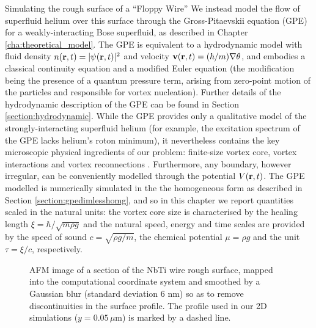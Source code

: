 \begin{chapter}{\label{cha:afm}Simulating the rough surface of a ``Floppy Wire''}
We instead model the flow of superfluid helium over this surface through the Gross-Pitaevskii equation (GPE) \cite{RobertsBerloff} for a weakly-interacting Bose superfluid, as described in Chapter \ref{cha:theoretical_model}. The GPE is equivalent to a hydrodynamic model with fluid density $n({\bf r},t)=|\psi({\bf r},t)|^2$ and velocity ${\bf v}({\bf r},t)=(\hbar/m)\nabla \theta$, and embodies a classical 
continuity equation and a modified Euler equation (the modification being the presence of a quantum pressure term, arising from zero-point motion of the particles {and responsible for vortex nucleation}). Further details of the hydrodynamic description of the GPE can be found in Section \ref{section:hydrodynamic}.
While the GPE provides only a qualitative model of the strongly-interacting superfluid helium (for example, the excitation spectrum of the GPE lacks helium's roton minimum), it nevertheless contains the key microscopic physical ingredients of our problem: finite-size vortex core, vortex interactions and vortex reconnections \cite{RobertsBerloff}.  Furthermore, any boundary, however irregular, can be conveniently modelled through the potential $V({\bf r},t)$. The GPE modelled is numerically simulated in the the homogeneous form as described in Section \ref{section:gpedimlesshomg}, and so in this chapter we report quantities scaled in the natural units: the vortex core size is characterised by the healing length $\xi=\hbar/\sqrt{m \rho g}$ and the natural speed, energy and time scales are provided by the speed of sound $c=\sqrt{\rho g/m}$, the chemical potential $\mu=\rho g$ and the unit $\tau=\xi/c$, respectively. 

\begin{figure}
  \centering
  \caption{\label{fig:afmsmooth}AFM image of a section of the NbTi wire rough surface, mapped into the computational coordinate system and smoothed by a Gaussian blur (standard deviation 6 nm) so as to remove discontinuities in the surface profile. The profile used in our 2D simulations ($y=0.05\,\mu$m) is marked by a dashed line.}
\end{figure}


\end{chapter}
